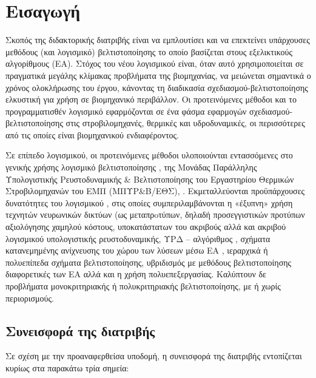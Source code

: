 

\chapter{Εισαγωγή}
\ifpdf
    \graphicspath{{1_introduction/figures/PNG/}{1_introduction/figures/PDF/}{1_introduction/figures/}}
\else
    \graphicspath{{1_introduction/figures/EPS/}{1_introduction/figures/}}
\fi
Σκοπός της διδακτορικής διατριβής είναι να εμπλουτίσει και να επεκτείνει υπάρχουσες μεθόδους (και λογισμικό) βελτιστοποίησης το οποίο βασίζεται στους εξελικτικούς αλγορίθμους (ΕΑ). Στόχος του νέου λογισμικού είναι, όταν αυτό χρησιμοποιείται σε πραγματικά μεγάλης κλίμακας προβλήματα της βιομηχανίας, να μειώνεται σημαντικά ο χρόνος ολοκλήρωσης του έργου, κάνοντας τη διαδικασία σχεδιασμού-βελτιστοποίησης ελκυστική για χρήση σε βιομηχανικό περιβάλλον. Οι προτεινόμενες μέθοδοι και το προγραμματισθέν λογισμικό εφαρμόζονται σε ένα φάσμα εφαρμογών σχεδιασμού-βελτιστοποίησης στις στροβιλομηχανές, θερμικές και υδροδυναμικές, οι περισσότερες από τις οποίες είναι βιομηχανικού ενδιαφέροντος.

Σε επίπεδο λογισμικού, οι προτεινόμενες μέθοδοι υλοποιούνται εντασσόμενες στο γενικής χρήσης λογισμικό βελτιστοποίησης , της Μονάδας Παράλληλης Υπολογιστικής Ρευστοδυναμικής \& Βελτιστοποίησης του Εργαστηρίου Θερμικών Στροβιλομηχανών του ΕΜΠ (ΜΠΥΡ\&Β/ΕΘΣ), \cite{phd_Giotis,phd_Karakasis,phd_Kampolis,EASYsite}. Εκμεταλλεύονται προϋπάρχουσες δυνατότητες του λογισμικού , στις οποίες συμπεριλαμβάνονται η «έξυπνη» χρήση τεχνητών νευρωνικών δικτύων (ως μεταπρoτύπων, δηλαδή προσεγγιστικών προτύπων αξιολόγησης χαμηλού κόστους, υποκατάστατων του ακριβούς αλλά και ακριβού λογισμικού υπολογιστικής ρευστοδυναμικής, ΥΡΔ – αλγόριθμος , σχήματα κατανεμημένης ανίχνευσης του χώρου των λύσεων μέσω ΕΑ , ιεραρχικά ή πολυεπίπεδα σχήματα βελτιστοποίησης, υβριδισμός με μεθόδους βελτιστοποίησης διαφορετικές των ΕΑ αλλά και η χρήση πολυεπεξεργασίας. Καλύπτουν δε προβλήματα μονοκριτηριακής ή πολυκριτηριακής βελτιστοποίησης, με ή χωρίς περιορισμούς.

\section{Συνεισφορά της διατριβής}
Σε σχέση με την προαναφερθείσα υποδομή, η συνεισφορά της διατριβής εντοπίζεται κυρίως στα παρακάτω τρία σημεία:

